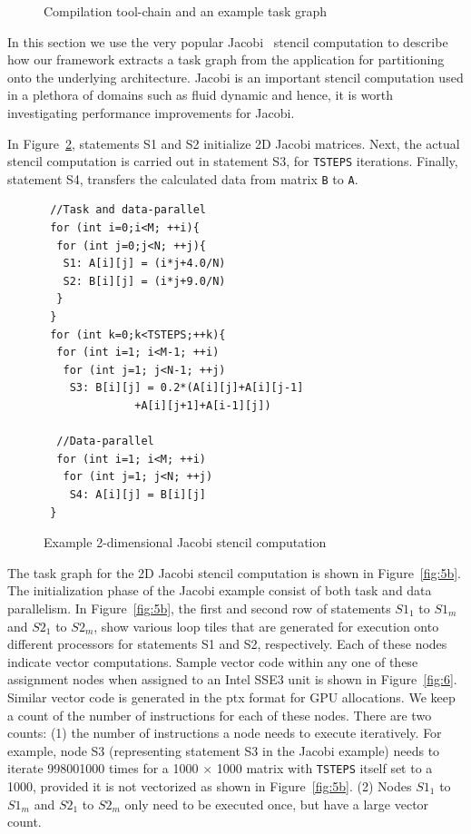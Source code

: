 \begin{figure}[t!]
{    \label{fig:5a}
  }
  \caption{Compilation tool-chain and an example task graph}
  \label{fig:5}
\end{figure}

In this section we use the very popular Jacobi~\cite{jacobi2} stencil
computation to describe how our framework extracts a task graph from the
application for partitioning onto the underlying architecture. Jacobi is
an important stencil computation used in a plethora of domains such as
fluid dynamic and hence, it is worth investigating performance
improvements for Jacobi.

In Figure~\ref{fig:4}, statements S1 and S2 initialize 2D Jacobi
matrices. Next, the actual stencil computation is carried out in
statement S3, for \texttt{TSTEPS} iterations. Finally, statement S4,
transfers the calculated data from matrix \texttt{B} to \texttt{A}.

\begin{scriptsize}
  \begin{figure}[h!]
    \centering
    \small{
\begin{verbatim}
 //Task and data-parallel
 for (int i=0;i<M; ++i){
  for (int j=0;j<N; ++j){
   S1: A[i][j] = (i*j+4.0/N)
   S2: B[i][j] = (i*j+9.0/N)
  }
 }
 for (int k=0;k<TSTEPS;++k){
  for (int i=1; i<M-1; ++i)
   for (int j=1; j<N-1; ++j)
    S3: B[i][j] = 0.2*(A[i][j]+A[i][j-1]
              +A[i][j+1]+A[i-1][j])

  //Data-parallel
  for (int i=1; i<M; ++i)
   for (int j=1; j<N; ++j)
    S4: A[i][j] = B[i][j]
 }
\end{verbatim}
    }
    \caption{Example 2-dimensional Jacobi stencil computation}
    \label{fig:4}
  \end{figure}
\end{scriptsize}

The task graph for the 2D Jacobi stencil computation is shown in
Figure~\ref{fig:5b}. The initialization phase of the Jacobi example
consist of both task and data parallelism. In Figure~\ref{fig:5b}, the
first and second row of statements $S1_1$ to $S1_m$ and $S2_1$ to
$S2_m$, show various loop tiles that are generated for execution onto
different processors for statements S1 and S2, respectively. Each of
these nodes indicate vector computations. Sample vector code within any
one of these assignment nodes when assigned to an Intel SSE3 unit is
shown in Figure~\ref{fig:6}. Similar vector code is generated in the ptx
format for GPU allocations. We keep a count of the number of
instructions for each of these nodes. There are two counts: (1) the
number of instructions a node needs to execute iteratively. For example,
node S3 (representing statement S3 in the Jacobi example) needs to
iterate 998001000 times for a 1000 $\times$ 1000 matrix with
\texttt{TSTEPS} itself set to a 1000, provided it is not vectorized as
shown in Figure~\ref{fig:5b}. (2) Nodes $S1_1$ to $S1_m$ and $S2_1$ to
$S2_m$ only need to be executed once, but have a large vector count.

